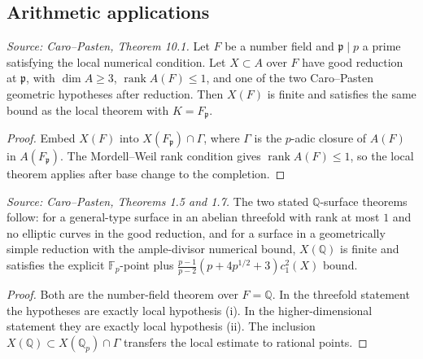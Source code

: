 \subsection{Arithmetic applications}

\begin{theorem}
  \label{thm:cp_number_field_bound}
  \textit{Source: Caro--Pasten, Theorem 10.1.}
  Let \(F\) be a number field and \(\mathfrak p\mid p\) a prime satisfying the
  local numerical condition.  Let \(X\subset A\) over \(F\) have good reduction
  at \(\mathfrak p\), with \(\dim A\ge3\), \(\operatorname{rank}A(F)\le1\),
  and one of the two Caro--Pasten geometric hypotheses after reduction.  Then
  \(X(F)\) is finite and satisfies the same bound as the local theorem with
  \(K=F_{\mathfrak p}\).
\end{theorem}
\begin{proof}
  Embed \(X(F)\) into \(X(F_{\mathfrak p})\cap\Gamma\), where \(\Gamma\) is
  the \(p\)-adic closure of \(A(F)\) in \(A(F_{\mathfrak p})\).  The
  Mordell--Weil rank condition gives \(\operatorname{rank}A(F)\le1\), so the
  local theorem applies after base change to the completion.
\end{proof}

\begin{theorem}
  \label{thm:cp_intro_surface_bounds}
  \textit{Source: Caro--Pasten, Theorems 1.5 and 1.7.}
  The two stated \(\mathbb Q\)-surface theorems follow: for a general-type
  surface in an abelian threefold with rank at most \(1\) and no elliptic
  curves in the good reduction, and for a surface in a geometrically simple
  reduction with the ample-divisor numerical bound, \(X(\mathbb Q)\) is finite
  and satisfies the explicit \(\mathbb F_p\)-point plus
  \(\frac{p-1}{p-2}(p+4p^{1/2}+3)c_1^2(X)\) bound.
\end{theorem}
\begin{proof}
  Both are the number-field theorem over \(F=\mathbb Q\).  In the threefold
  statement the hypotheses are exactly local hypothesis (i).  In the
  higher-dimensional statement they are exactly local hypothesis (ii).  The
  inclusion \(X(\mathbb Q)\subset X(\mathbb Q_p)\cap\Gamma\) transfers the
  local estimate to rational points.
\end{proof}

